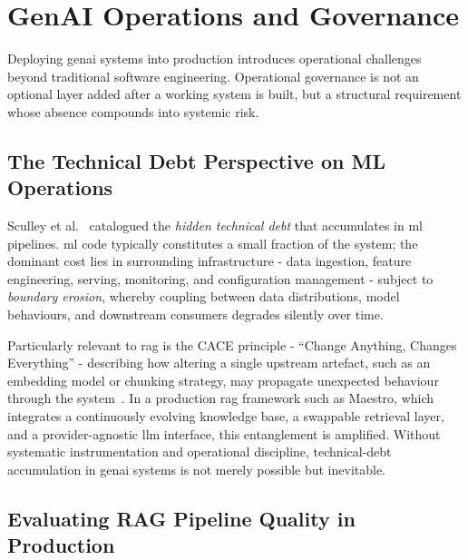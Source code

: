 
\section{GenAI Operations and Governance}
\label{sec:genai-ops-governance}

Deploying \gls{genai} systems into production introduces operational challenges beyond traditional software engineering. Operational governance is not an optional layer added after a working system is built, but a structural requirement whose absence compounds into systemic risk.

\subsection{The Technical Debt Perspective on ML Operations}

Sculley et al.~\cite{sculley2015debt} catalogued the \textit{hidden technical debt} that accumulates in \acrfull{ml} pipelines. \gls{ml} code typically constitutes a small fraction of the system; the dominant cost lies in surrounding infrastructure - data ingestion, feature engineering, serving, monitoring, and configuration management - subject to \textit{boundary erosion}, whereby coupling between data distributions, model behaviours, and downstream consumers degrades silently over time.

Particularly relevant to \gls{rag} is the CACE principle - ``Change Anything, Changes Everything'' - describing how altering a single upstream artefact, such as an embedding model or chunking strategy, may propagate unexpected behaviour through the system~\cite{sculley2015debt}. In a production \gls{rag} framework such as Maestro, which integrates a continuously evolving knowledge base, a swappable retrieval layer, and a provider-agnostic \gls{llm} interface, this entanglement is amplified. Without systematic instrumentation and operational discipline, technical-debt accumulation in \gls{genai} systems is not merely possible but inevitable.

\subsection{Evaluating RAG Pipeline Quality in Production}

